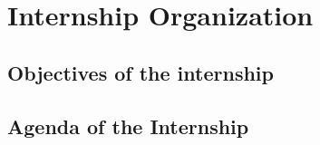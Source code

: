 \chapter{Internship Organization}

\section{Objectives of the internship}


%
%
%
%
%


\section{Agenda of the Internship}

